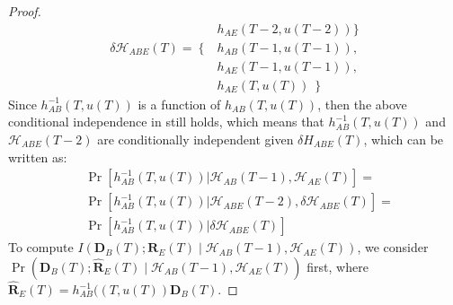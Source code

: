 \begin{proof}
\begin{align*}
& \left. h_{AE}\left(T-2, u(T-2)\right) \right. \}\\
\delta \mathcal{H}_{ABE}(T) = \left\{ \right. & \left. h_{AB}\left(T-1, u(T-1)\right), \right. \\
& \left. h_{AE}\left(T-1, u(T-1)\right), \right.\\
& \left. h_{AE}\left(T, u(T)\right)\ \right\}
\end{align*}
Since $h_{AB}^{-1}(T,u(T))$ is a function of $h_{AB}(T,u(T))$, then the above conditional independence in still holds, which means that  $h_{AB}^{-1}\left(T,u(T)\right)$ and $\mathcal{H}_{ABE}(T-2)$ are conditionally independent given $\delta H_{ABE}(T)$,
which can be written as:
\begin{align}
& \Pr\left[ h_{AB}^{-1}\left(T,u(T)\right) | \mathcal{H}_{AB}(T-1), \mathcal{H}_{AE}(T) \right] = \nonumber \\
& \Pr\left[ h_{AB}^{-1}\left(T,u(T)\right) | \mathcal{H}_{ABE}(T-2), \delta \mathcal{H}_{ABE}(T) \right] = \nonumber \\
& \Pr\left[ h_{AB}^{-1}\left(T,u(T)\right) | \delta \mathcal{H}_{ABE}(T) \right] \label{eq133}
\end{align}
To compute $I\left(\mathbf{D}_B(T);\mathbf{R}_E(T) \mid \right. \left. \mathcal{H}_{AB}(T-1),\mathcal{H}_{AE}(T)\right)$, we consider $\Pr\left(\mathbf{D}_B(T);\hat{\mathbf{R}}_E(T) \mid \mathcal{H}_{AB}(T-1),\mathcal{H}_{AE}(T)\right)$
first, where $\hat{\mathbf{R}}_E(T) = h_{AB}^{-1}(\left(T,u(T)\right)  \mathbf{D}_B(T)$.


\end{proof}
